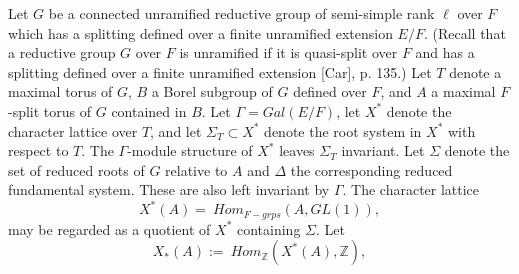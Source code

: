 \documentclass[12pt]{article}
\begin{document}
Let $G$ be a connected unramified reductive group of semi-simple rank $\ell$ over $F$ which has a splitting defined over a finite unramified extension $E/F$. (Recall that a reductive group $G$ over $F$ is unramified if it is quasi-split over $F$ and has a splitting defined over a finite unramified extension [Car], p. 135.) Let $T$ denote a maximal torus of $G$, $B$ a Borel subgroup of $G$ defined over $F$, and $A$ a maximal $F$-split torus of $G$ contained in $B$. Let $\Gamma=Gal(E/F)$, let $X^*$ denote the character lattice over $T$, and let $\Sigma_T\subset X^*$ denote the root system in $X^*$ with respect to $T$. The $\Gamma$-module structure of $X^*$ leaves $\Sigma_T$ invariant. Let $\Sigma$ denote the set of reduced roots of $G$ relative to $A$ and $\Delta$ the corresponding reduced fundamental system. These are also left invariant by $\Gamma$. The character lattice
\begin{equation}\tag{2.1}
X^*(A)=\ Hom_{F-grps}(A,GL(1)),
\end{equation}
may be regarded as a quotient of $X^*$ containing $\Sigma$. Let
\begin{equation}\tag{2.2}
X_*(A):=\ Hom_{\mathbb{Z}}(X^*(A),\mathbb{Z}),
\end{equation}
\end{document}
